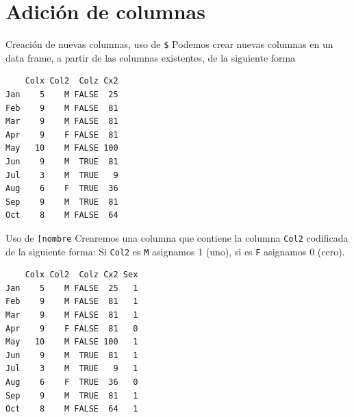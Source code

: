 \documentclass[
  ignorenonframetext,
  aspectratio=169,
  spanish,
]{beamer}
\newenvironment{Shaded}{\begin{snugshade}}{\end{snugshade}}
\newcommand{\DecValTok}[1]{\textcolor[rgb]{0.68,0.00,0.00}{#1}}
\newcommand{\FunctionTok}[1]{\textcolor[rgb]{0.28,0.35,0.67}{#1}}
\newcommand{\NormalTok}[1]{\textcolor[rgb]{0.00,0.23,0.31}{#1}}
\newcommand{\OtherTok}[1]{\textcolor[rgb]{0.00,0.23,0.31}{#1}}
\newcommand{\SpecialCharTok}[1]{\textcolor[rgb]{0.37,0.37,0.37}{#1}}
\newcommand{\StringTok}[1]{\textcolor[rgb]{0.13,0.47,0.30}{#1}}
\begin{document}
\section{Adición de columnas}\label{adiciuxf3n-de-columnas}

\begin{frame}[fragile]{Creación de nuevas columnas, uso de \texttt{\$}}
\label{creaciuxf3n-de-nuevas-columnas-uso-de}
Podemos crear nuevas columnas en un data frame, a partir de las columnas
existentes, de la siguiente forma

\begin{Shaded}
\end{Shaded}

\begin{verbatim}
    Colx Col2  Colz Cx2
Jan    5    M FALSE  25
Feb    9    M FALSE  81
Mar    9    M FALSE  81
Apr    9    F FALSE  81
May   10    M FALSE 100
Jun    9    M  TRUE  81
Jul    3    M  TRUE   9
Aug    6    F  TRUE  36
Sep    9    M  TRUE  81
Oct    8    M FALSE  64
\end{verbatim}
\end{frame}

\begin{frame}[fragile]{Uso de
\texttt{{[}\textquotesingle{}nombre\textquotesingle{}{]}}}
\label{uso-de-nombre}
Crearemos una columna que contiene la columna \texttt{Col2} codificada
de la siguiente forma: Si \texttt{Col2} es \texttt{M} asignamos 1 (uno),
si es \texttt{F} asignamos 0 (cero).

\begin{Shaded}
\end{Shaded}

\begin{verbatim}
    Colx Col2  Colz Cx2 Sex
Jan    5    M FALSE  25   1
Feb    9    M FALSE  81   1
Mar    9    M FALSE  81   1
Apr    9    F FALSE  81   0
May   10    M FALSE 100   1
Jun    9    M  TRUE  81   1
Jul    3    M  TRUE   9   1
Aug    6    F  TRUE  36   0
Sep    9    M  TRUE  81   1
Oct    8    M FALSE  64   1
\end{verbatim}
\end{frame}
\end{document}
